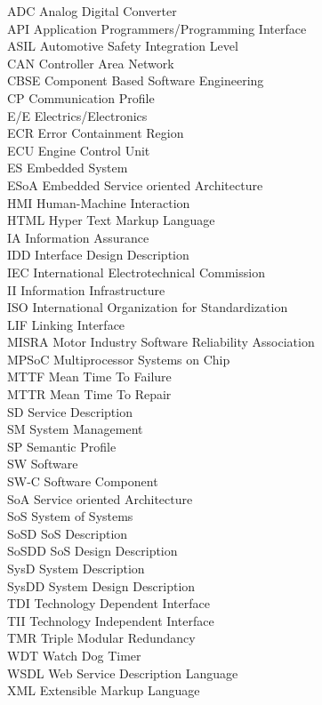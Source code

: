 ADC \tocdotfill Analog Digital Converter\\
API \tocdotfill Application Programmers/Programming Interface\\
ASIL \tocdotfill Automotive Safety Integration Level\\
CAN \tocdotfill Controller Area Network\\
CBSE \tocdotfill Component Based Software Engineering\\
CP \tocdotfill Communication Profile\\
E/E \tocdotfill Electrics/Electronics\\
ECR \tocdotfill Error Containment Region\\
ECU \tocdotfill Engine Control Unit\\
ES \tocdotfill Embedded System\\
ESoA \tocdotfill Embedded Service oriented Architecture\\
HMI \tocdotfill Human-Machine Interaction\\
HTML \tocdotfill Hyper Text Markup Language\\
IA \tocdotfill Information Assurance\\
IDD \tocdotfill Interface Design Description\\
IEC \tocdotfill International Electrotechnical Commission\\
II \tocdotfill Information Infrastructure\\
ISO \tocdotfill International Organization for Standardization\\
LIF \tocdotfill Linking Interface\\
MISRA \tocdotfill Motor Industry Software Reliability Association\\
MPSoC \tocdotfill Multiprocessor Systems on Chip\\
MTTF \tocdotfill Mean Time To Failure\\
MTTR \tocdotfill Mean Time To Repair\\
SD \tocdotfill Service Description\\
SM \tocdotfill System Management\\
SP \tocdotfill Semantic Profile\\
SW \tocdotfill Software\\
SW-C \tocdotfill Software Component\\
SoA \tocdotfill Service oriented Architecture\\
SoS \tocdotfill System of Systems\\
SoSD \tocdotfill SoS Description\\
SoSDD \tocdotfill SoS Design Description\\
SysD \tocdotfill System Description\\
SysDD \tocdotfill System Design Description\\
TDI \tocdotfill Technology Dependent Interface\\
TII \tocdotfill Technology Independent Interface\\
TMR \tocdotfill Triple Modular Redundancy\\
WDT \tocdotfill Watch Dog Timer\\
WSDL \tocdotfill Web Service Description Language\\
XML \tocdotfill Extensible Markup Language\\